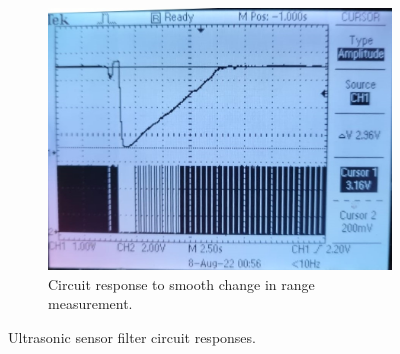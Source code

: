 \begin{figure}[H]
\begin{subfigure}[]{0.45\textwidth}
\includegraphics[width=\linewidth]{./Figures/SonicSens_Prac_Range.jpeg}
\caption{Circuit response to smooth change in range measurement.}
\label{subfig:sonicsen_prac_range}	
\end{subfigure}
\caption{Ultrasonic sensor filter circuit responses.}
\label{fig:sonicsen_prac}
\end{figure}
